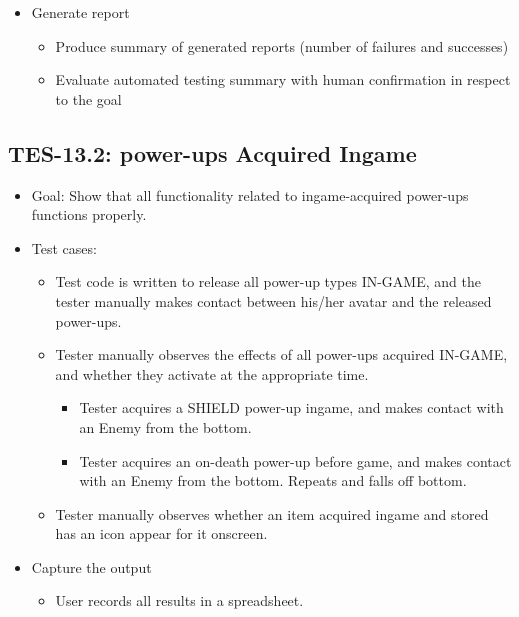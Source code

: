 \begin{itemize}
\begin{itemize}
\end{itemize}

\item Generate report 
\begin{itemize}
\item Produce summary of generated reports (number of failures and successes)
\item Evaluate automated testing summary with human confirmation in respect to the goal
\end{itemize}
\end{itemize}

\subsection{TES-13.2: power-ups Acquired Ingame}
\begin{itemize}
\item Goal: Show that all functionality related to ingame-acquired power-ups functions properly.

\item Test cases: 
\begin{itemize}
\item Test code is written to release all power-up types IN-GAME, and the tester manually makes contact between his/her avatar and
the released power-ups.
\item Tester manually observes the effects of all power-ups acquired IN-GAME, and whether they activate at the appropriate time.
\begin{itemize}
\item Tester acquires a SHIELD power-up ingame, and makes contact with an Enemy from the bottom.
\item Tester acquires an on-death power-up before game, and makes contact with an Enemy from the bottom. Repeats and falls off bottom.
\end{itemize}
\item Tester manually observes whether an item acquired ingame and stored has an icon appear for it onscreen.
\end{itemize}

\item Capture the output 
\begin{itemize}
\item User records all results in a spreadsheet.
\end{itemize}


\end{itemize}
